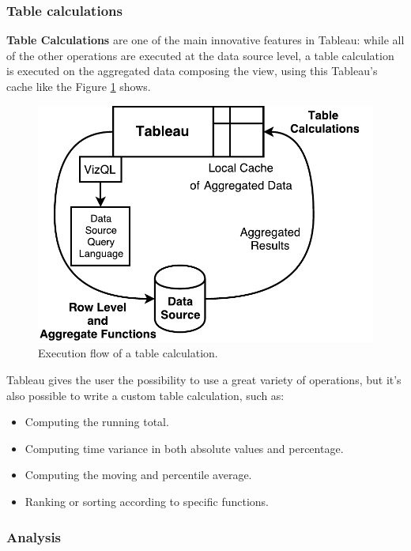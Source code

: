 \subsubsection{Table calculations}

\textbf{Table Calculations} are one of the main innovative features in Tableau: while all of the other operations are executed at the data source level, a table calculation is executed on the aggregated data composing the view, using this Tableau's cache like the Figure \ref{fig:TableCalculation} shows.


\begin{figure}[ht]
    \begin{center}
        \includegraphics[width=0.8\linewidth]{Figures/TableCalculation}
    \end{center}
    \caption{Execution flow of a table calculation.}
    \label{fig:TableCalculation}
\end{figure}

Tableau gives the user the possibility to use a great variety of operations, but it's also possible to write a custom table calculation, such as:

\begin{itemize}
    \item Computing the running total.
    \item Computing time variance in both absolute values and percentage.
    \item Computing the moving and percentile average.
    \item Ranking or sorting according to specific functions.
\end{itemize}

\subsubsection{Analysis}

